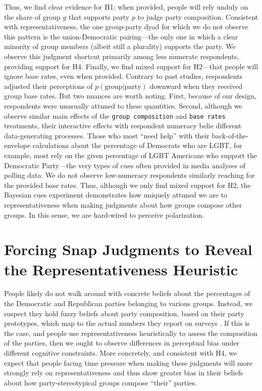 \documentclass[12pt, letterpaper]{article}
\begin{document}
Thus, we find clear evidence for H1: when provided, people will rely unduly on the share of group $g$ that supports party $p$ to judge party composition. Consistent with representativeness, the one group-party dyad for which we do not observe this pattern is the union-Democratic pairing---the only one in which a clear minority of group members (albeit still a plurality) supports the party. We observe this judgment shortcut primarily among less numerate respondents, providing support for H4. Finally, we find mixed support for H2---that people will ignore base rates, even when provided. Contrary to past studies, respondents adjusted their perceptions of $p(\text{group|party})$ downward when they received group base rates. But two nuances are worth noting. First, because of our design, respondents were unusually attuned to these quantities. Second, although we observe similar main effects of the {\tt group composition} and {\tt base rates} treatments, their interactive effects with respondent numeracy belie different data-generating processes. Those who most ``need help'' with their back-of-the-envelope calculations about the percentage of Democrats who are LGBT, for example, most rely on the given percentage of LGBT Americans who support the Democratic Party---the very types of cues often provided in media analyses of polling data. We do not observe low-numeracy respondents similarly reaching for the provided base rates. Thus, although we only find mixed support for H2, the Bayesian cues experiment demonstrates how uniquely attuned we are to representativeness when making judgments about how groups compose other groups. In this sense, we are hard-wired to perceive polarization. 

\section{Forcing Snap Judgments to Reveal the Representativeness Heuristic}

People likely do not walk around with concrete beliefs about the percentages of the Democratic and Republican parties belonging to various groups. Instead, we suspect they hold fuzzy beliefs about party composition, based on their party prototypes, which map to the actual numbers they report on surveys \citep{ahler2017}. If this is the case, and people use representativeness heuristically to assess the composition of the parties, then we ought to observe differences in perceptual bias under different cognitive constraints. More concretely, and consistent with H4, we expect that people facing time pressure when making these judgments will more strongly rely on representativeness and thus show greater bias in their beliefs about how party-stereotypical groups compose ``their'' parties.
\end{document}
